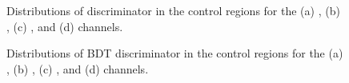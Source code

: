 \begin{figure}[htbp!]
  \caption{Distributions of \mcol discriminator in the \Ztt control regions for the (a) \Hmuhad, (b) \Hmue, (c) \Hehad, and (d) \Hemu channels.}
  \label{fig:ztt_control}
\end{figure}

\begin{figure}[htbp!]
  \centering
  \caption{Distributions of BDT discriminator in the \Ztt control regions for the (a) \Hmuhad, (b) \Hmue, (c) \Hehad, and (d) \Hemu channels.}
  \label{fig:ztt_control_BDT}
\end{figure}

